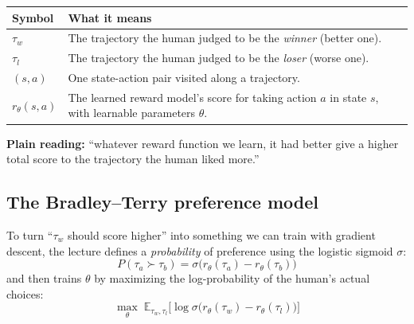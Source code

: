 \documentclass[11pt]{article}
\begin{document}
\begin{center}
\begin{tabular}{|>{\raggedright\arraybackslash}p{3.2cm}|>{\raggedright\arraybackslash}p{10.3cm}|}
\hline
\textbf{Symbol} & \textbf{What it means} \\
\hline
$\tau_w$ & The trajectory the human judged to be the \emph{winner} (better one). \\
\hline
$\tau_l$ & The trajectory the human judged to be the \emph{loser} (worse one). \\
\hline
$(s,a)$ & One state-action pair visited along a trajectory. \\
\hline
$r_\theta(s,a)$ & The learned reward model's score for taking action $a$ in state
$s$, with learnable parameters $\theta$. \\
\hline
\end{tabular}
\end{center}
\textbf{Plain reading:} ``whatever reward function we learn, it had better give a
higher total score to the trajectory the human liked more.''

\subsection{The Bradley--Terry preference model}
To turn ``$\tau_w$ should score higher'' into something we can train with
gradient descent, the lecture defines a \emph{probability} of preference using
the logistic sigmoid $\sigma$:
\[
P(\tau_a \succ \tau_b) = \sigma\big(r_\theta(\tau_a) - r_\theta(\tau_b)\big)
\]
and then trains $\theta$ by maximizing the log-probability of the human's actual
choices:
\[
\max_\theta \; \mathbb{E}_{\tau_w,\tau_l}\Big[\log \sigma\big(r_\theta(\tau_w) -
r_\theta(\tau_l)\big)\Big]
\]
\end{document}
